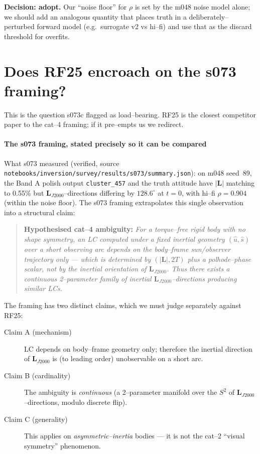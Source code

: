 \documentclass[11pt]{article}
\newcommand{\Lvec}{\mathbf{L}}
\newcommand{\LJ}{\Lvec_{J2000}}
\newcommand{\ttt}[1]{\texttt{#1}}
\begin{document}
\textbf{Decision: adopt.} Our ``noise floor'' for $\rho$ is set by the
m048 noise model alone; we should add an analogous quantity that places
truth in a deliberately--perturbed forward model (e.g.\ surrogate v2 vs
hi--fi) and use that as the discard threshold for overfits.

\part{Does RF25 encroach on the s073 framing?}
\label{part:encroachment}

\noindent
This is the question s073c flagged as load--bearing. RF25 is the closest
competitor paper to the cat--4 framing; if it pre--empts us we redirect.

\subsection{The s073 framing, stated precisely so it can be compared}

\noindent
What s073 measured (verified, source \ttt{notebooks/inversion/survey/results/s073/summary.json}):
on m048 seed~89, the Band A polish output \ttt{cluster\_457} and the truth
attitude have $|\Lvec|$ matching to 0.55\% but $\LJ$--directions differing by
$128.6^\circ$ at $t=0$, with hi--fi $\rho = 0.904$ (within the noise floor).
The s073 framing extrapolates this single observation into a structural claim:

\begin{quote}
\textbf{Hypothesised cat--4 ambiguity:} \emph{For a torque--free rigid body
with no shape symmetry, an LC computed under a fixed inertial geometry
$(\hat{u}, \hat{s})$ over a short observing arc depends on the body--frame
sun/observer trajectory only --- which is determined by $(|\Lvec|, 2T)$
plus a polhode--phase scalar, not by the inertial orientation of $\LJ$. Thus
there exists a continuous 2--parameter family of inertial $\LJ$--directions
producing similar LCs.}
\end{quote}

\noindent
The framing has two distinct claims, which we must judge separately against
RF25:
\begin{description}
\item[Claim A (mechanism)] LC depends on body--frame geometry only; therefore
the inertial direction of $\LJ$ is (to leading order) unobservable on a
short arc.
\item[Claim B (cardinality)] The ambiguity is \emph{continuous} (a
2--parameter manifold over the $S^2$ of $\LJ$--directions, modulo discrete
flip).
\item[Claim C (generality)] This applies on \emph{asymmetric--inertia}
bodies --- it is not the cat--2 ``visual symmetry'' phenomenon.
\end{description}
\end{document}
